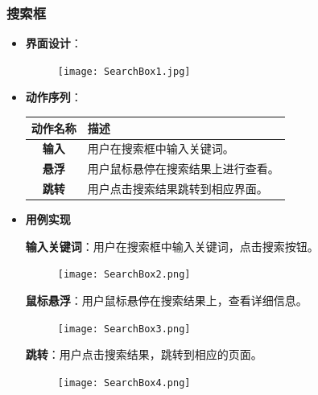 \subsubsection{搜索框}
\begin{itemize}
	\item \textbf{界面设计}：
	\begin{figure}[H]
		\centering
		\texttt{[image: SearchBox1.jpg]}
		\label{SearchBox}
	\end{figure}
	\item \textbf{动作序列}：
	\begin{table}[H]
		\centering
		\renewcommand\arraystretch{1.5}
		\begin{tabular}{|c|>{\raggedright\arraybackslash}p{10cm}|}
			\hline
			\textbf{动作名称} & \textbf{描述} \\ \hline
			\textbf{输入} & 用户在搜索框中输入关键词。  \\ \hline
			\textbf{悬浮} & 用户鼠标悬停在搜索结果上进行查看。 \\ \hline
			\textbf{跳转} & 用户点击搜索结果跳转到相应界面。 \\ \hline
		\end{tabular}
	\end{table}

	\item \textbf{用例实现}

	\textbf{输入关键词}：用户在搜索框中输入关键词，点击搜索按钮。

	\begin{figure}[H]
		\centering
		\texttt{[image: SearchBox2.png]}
		\label{输入关键词}	
	\end{figure}

	\textbf{鼠标悬浮}：用户鼠标悬停在搜索结果上，查看详细信息。

	\begin{figure}[H]
		\centering
		\texttt{[image: SearchBox3.png]}
		\label{鼠标悬浮}
	\end{figure}

	\textbf{跳转}：用户点击搜索结果，跳转到相应的页面。

	\begin{figure}[H]
		\centering
		\texttt{[image: SearchBox4.png]}
		\label{跳转}
	\end{figure}


\end{itemize}
